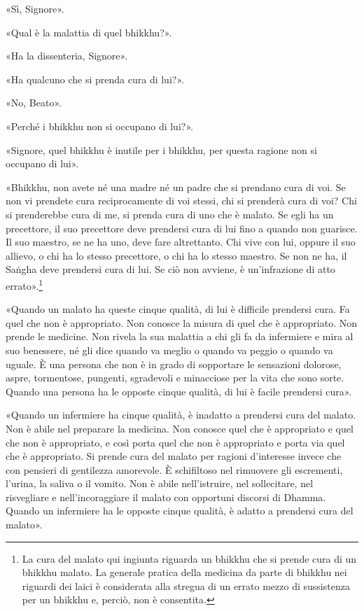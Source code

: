«Sì, Signore».

«Qual è la malattia di quel bhikkhu?».

«Ha la dissenteria, Signore».

«Ha qualcuno che si prenda cura di lui?».

«No, Beato».

«Perché i bhikkhu non si occupano di lui?».

«Signore, quel bhikkhu è inutile per i bhikkhu, per questa ragione non si
occupano di lui».

«Bhikkhu, non avete né una madre né un padre che si prendano cura di voi. Se non
vi prendete cura reciprocamente di voi stessi, chi si prenderà cura di voi? Chi
si prenderebbe cura di me, si prenda cura di uno che è malato. Se egli ha un
precettore, il suo precettore deve prendersi cura di lui fino a quando non
guarisce. Il suo maestro, se ne ha uno, deve fare altrettanto. Chi vive con lui,
oppure il suo allievo, o chi ha lo stesso precettore, o chi ha lo stesso
maestro. Se non ne ha, il Saṅgha deve prendersi cura di lui. Se ciò non avviene,
è un’infrazione di atto errato».\footnote{La cura del malato qui ingiunta
  riguarda un bhikkhu che si prende cura di un bhikkhu malato. La generale
  pratica della medicina da parte di bhikkhu nei riguardi dei laici è
  considerata alla stregua di un errato mezzo di sussistenza per un bhikkhu e,
  perciò, non è consentita.}

«Quando un malato ha queste cinque qualità, di lui è difficile prendersi cura.
Fa quel che non è appropriato. Non conosce la misura di quel che è appropriato.
Non prende le medicine. Non rivela la sua malattia a chi gli fa da infermiere e
mira al suo benessere, né gli dice quando va meglio o quando va peggio o quando
va uguale. È una persona che non è in grado di sopportare le sensazioni
dolorose, aspre, tormentose, pungenti, sgradevoli e minacciose per la vita che
sono sorte. Quando una persona ha le opposte cinque qualità, di lui è facile
prendersi cura».


«Quando un infermiere ha cinque qualità, è inadatto a prendersi cura del malato.
Non è abile nel preparare la medicina. Non conosce quel che è appropriato e quel
che non è appropriato, e così porta quel che non è appropriato e porta via quel
che è appropriato. Si prende cura del malato per ragioni d’interesse invece che
con pensieri di gentilezza amorevole. È schifiltoso nel rimuovere gli
escrementi, l’urina, la saliva o il vomito. Non è abile nell’istruire, nel
sollecitare, nel risvegliare e nell’incoraggiare il malato con opportuni
discorsi di Dhamma. Quando un infermiere ha le opposte cinque qualità, è adatto
a prendersi cura del malato».

